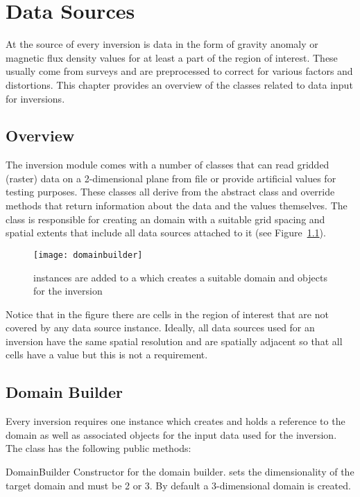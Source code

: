 \chapter{Data Sources}\label{Chp:ref:data sources}

At the source of every inversion is data in the form of gravity anomaly or
magnetic flux density values for at least a part of the region of interest.
These usually come from surveys and are preprocessed to correct for various
factors and distortions.
This chapter provides an overview of the classes related to data input for
inversions.

\section{Overview}
The inversion module comes with a number of classes that can read gridded
(raster) data on a 2-dimensional plane from file or provide artificial values
for testing purposes. These classes all derive from the abstract
 class and override methods that return information about
the data and the values themselves.
The  class is responsible for creating an \escript domain
with a suitable grid spacing and spatial extents that include all data sources
attached to it (see Figure~\ref{fig:domainBuilder}).
%
\begin{figure}[ht]
    \centering\texttt{[image: domainbuilder]}
    \caption{ instances are added to a 
        which creates a suitable domain and \Data objects for the inversion}
    \label{fig:domainBuilder}
\end{figure}
%
Notice that in the figure there are cells in the region of interest that are
not covered by any data source instance.
Ideally, all data sources used for an inversion have the same spatial resolution
and are spatially adjacent so that all cells have a value but this is not a
requirement.


\section{Domain Builder}\label{Chp:ref:domain builder}
Every inversion requires one  instance which creates and
holds a reference to the \escript domain as well as associated \Data objects for
the input data used for the inversion.
The class has the following public methods:

\begin{classdesc}{DomainBuilder}{}
Constructor for the domain builder.  sets the dimensionality of the
target domain and must be 2 or 3. By default a 3-dimensional domain is created.
\end{classdesc}

